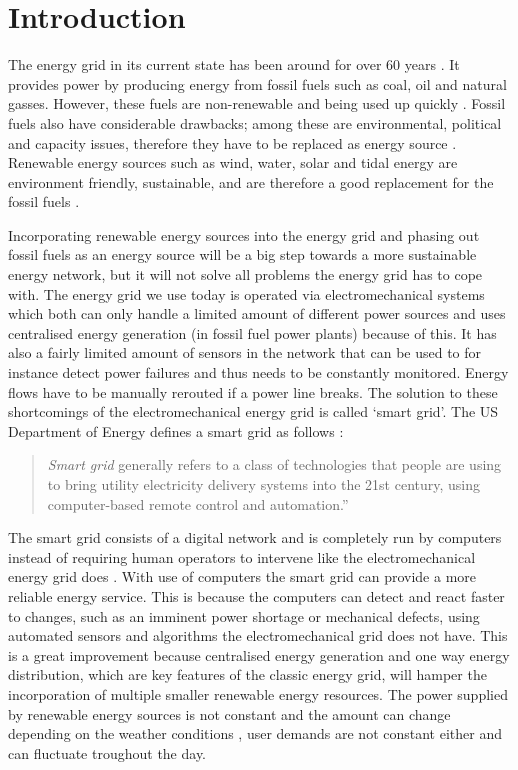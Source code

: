 \section{Introduction}\label{intro}
The energy grid in its current state has been around for over 60 years \cite{Wang2011}. It provides power by producing energy from fossil fuels such as coal, oil and natural gasses. However, these fuels are non-renewable and being used up quickly \cite{Wang2011}. Fossil fuels also have considerable drawbacks; among these are environmental, political and capacity issues, therefore they have to be replaced as energy source \cite{friedman2008hot}. Renewable energy sources such as wind, water, solar and tidal energy are environment friendly, sustainable, and are therefore a good replacement for the fossil fuels \cite{Tromly2001}.

Incorporating renewable energy sources into the energy grid and phasing out fossil fuels as an energy source will be a big step towards a more sustainable energy network, but it will not solve all problems the energy grid has to cope with. The energy grid we use today is operated via electromechanical systems which both can only handle a limited amount of different power sources and uses centralised energy generation (in fossil fuel power plants) because of this. It has also a fairly limited amount of sensors in the network that can be used to for instance detect power failures and thus needs to be constantly monitored. Energy flows have to be manually rerouted if a power line breaks. The solution to these shortcomings of the electromechanical energy grid is called `smart grid'. The US Department of Energy defines a smart grid as follows \cite{doe}: 
 
\begin{quote}
\emph{Smart grid} generally refers to a class of technologies that people are using to bring utility electricity delivery systems into the 21st century, using computer-based remote control and automation.''
\end{quote}

The smart grid consists of a digital network and is completely run by computers instead of requiring human operators to intervene like the electromechanical energy grid does \cite{Moslehi2010}. With use of computers the smart grid can provide a more reliable energy service. This is because the computers can detect and react faster to changes, such as an imminent power shortage or mechanical defects, using automated sensors and algorithms the electromechanical grid does not have. This is a great improvement because centralised energy generation and one way energy distribution, which are key features of the classic energy grid, will hamper the incorporation of multiple smaller renewable energy resources. The power supplied by renewable energy sources is not constant and the amount can change depending on the weather conditions \cite{RamchurnVitelingumRogersJennings2014}, user demands are not constant either and can fluctuate troughout the day.

